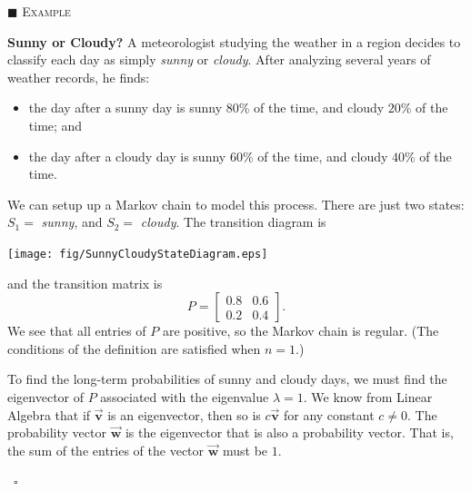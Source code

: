 \documentclass[reqno]{immbook}
\newcommand{\BV}{\vec{\textbf{v}}}
\newcommand{\BW}{\vec{\textbf{w}}}
\numberwithin{equation}{chapter}
\numberwithin{question}{section}
\numberwithin{theorem}{chapter}
\numberwithin{figure}{chapter}
\theoremstyle{definition}
\newenvironment{xexample}%
{%

\medskip\noindent\addtocounter{example}{1}$\blacksquare$ \textsc{Example \theexample}\hspace*{1em}%
}%
{%
~\hfill$\square$

\medskip
}
\begin{document}
\begin{xexample}
\textbf{Sunny or Cloudy?}
A meteorologist studying the weather in a region
decides to classify each day as simply \emph{sunny}
or \emph{cloudy}.  After analyzing several years of weather records,
he finds:
\begin{itemize}
\item the day after a sunny day is
sunny $80$\% of the time, and cloudy $20$\% of the time; and
\item the day after a cloudy day is
sunny $60$\% of the time, and cloudy $40$\% of the time.
\end{itemize}
We can setup up a Markov chain to model this process.
There are just two states: $S_1=$ \emph{sunny}, and $S_2 = $ \emph{cloudy}.
The transition diagram is

\medskip
\centerline{%
\texttt{[image: fig/SunnyCloudyStateDiagram.eps]}
}

\medskip
\noindent
and the transition matrix is
\begin{equation}
  P = \begin{bmatrix}
          0.8 & 0.6 \\
	  0.2 & 0.4 
      \end{bmatrix}.
\end{equation}
We see that all entries of $P$ are positive, so the Markov
chain is regular.  (The conditions of the 
definition are satisfied when $n=1$.)

To find the long-term probabilities of sunny and cloudy days,
we must find the eigenvector of $P$ associated with the
eigenvalue $\lambda=1$. We know from Linear Algebra that
if $\BV$ is an eigenvector, then so is $c\BV$ for any
constant $c\ne0$.  The probability vector $\BW$ is the
eigenvector that is also a probability vector. That is,
the sum of the entries of the vector $\BW$ must be $1$.


\end{xexample}
\end{document}
